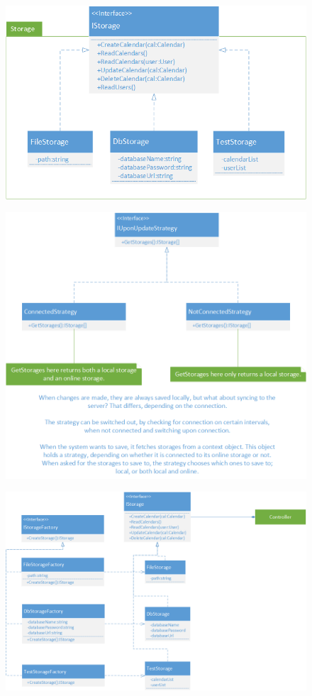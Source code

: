 \documentclass[10pt]{report}
\numberwithin{equation}{section} %
\numberwithin{figure}{section} %
\numberwithin{table}{section} %
\begin{document}
\begin{figure}[H]
  \includegraphics[scale=0.40]{figures/class_storage_bridge.png}
\end{figure}

\begin{figure}[H]
  \includegraphics[scale=0.40]{figures/strategy_pattern.png}
\end{figure}

\begin{figure}[H]
  \includegraphics[scale=0.40]{figures/factory_pattern.png}
\end{figure}
\end{document}
